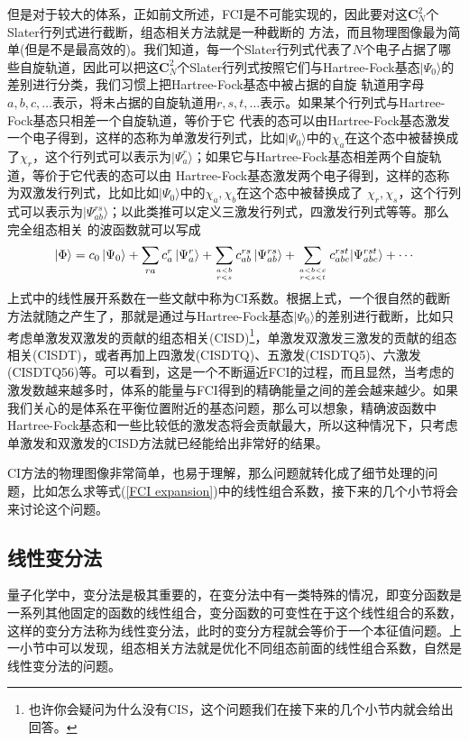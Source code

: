 \documentclass[12pt,a4paper,openany,twoside]{book}
\numberwithin{equation}{section}
\begin{document}
          但是对于较大的体系，正如前文所述，FCI是不可能实现的，因此要对这$\mathbf{C}_N^2$个Slater行列式进行截断，组态相关方法就是一种截断的 方法，而且物理图像最为简单(但是不是最高效的)。我们知道，每一个Slater行列式代表了$N$个电子占据了哪些自旋轨道，因此可以把这$\mathbf  {C}_N^2$个Slater行列式按照它们与Hartree-Fock基态$ | \Psi_0 \rangle $的差别进行分类，我们习惯上把Hartree-Fock基态中被占据的自旋  轨道用字母$a,b,c,\dots$表示，将未占据的自旋轨道用$r,s,t,\dots$表示。如果某个行列式与Hartree-Fock基态只相差一个自旋轨道，等价于它  代表的态可以由Hartree-Fock基态激发一个电子得到，这样的态称为单激发行列式，比如$ | \Psi_0 \rangle $中的$\chi_a$在这个态中被替换成  了$\chi_r$，这个行列式可以表示为$| \Psi_a^r\rangle$；如果它与Hartree-Fock基态相差两个自旋轨道，等价于它代表的态可以由 Hartree-Fock基态激发两个电子得到，这样的态称为双激发行列式，比如比如$ | \Psi_0 \rangle $中的$\chi_a,\chi_b$在这个态中被替换成了  $\chi_r,\chi_s$，这个行列式可以表示为$| \Psi_{ab}^{rs}\rangle$；以此类推可以定义三激发行列式，四激发行列式等等。那么完全组态相关  的波函数就可以写成
          \begin{equation}
            |\Phi\rangle= c_{0}\left|\Psi_{0}\right\rangle+\sum_{r a} c_{a}^{r}\left|\Psi_{a}^{r}\right\rangle+\sum_{a<b \atop r<s} c_{a b}^{r s}\left|\Psi_{a b}^{r s}\right\rangle+\sum_{a<b<c \atop r<s<t} c_{a b c}^{r s t}|\Psi_{a b c}^{r s t}\rangle+\cdots
            \label{FCI expansion}
          \end{equation}
          上式中的线性展开系数在一些文献中称为CI系数。根据上式，一个很自然的截断方法就随之产生了，那就是通过与Hartree-Fock基态$ | \Psi_0 \rangle $的差别进行截断，比如只考虑单激发双激发的贡献的组态相关(CISD)\footnote{也许你会疑问为什么没有CIS，这个问题我们在接下来的几个小节内就会给出回答。}，单激发双激发三激发的贡献的组态相关(CISDT)，或者再加上四激发(CISDTQ)、五激发(CISDTQ5)、六激发(CISDTQ56)等。可以看到，这是一个不断逼近FCI的过程，而且显然，当考虑的激发数越来越多时，体系的能量与FCI得到的精确能量之间的差会越来越少。如果我们关心的是体系在平衡位置附近的基态问题，那么可以想象，精确波函数中Hartree-Fock基态和一些比较低的激发态将会贡献最大，所以这种情况下，只考虑单激发和双激发的CISD方法就已经能给出非常好的结果。

          CI方法的物理图像非常简单，也易于理解，那么问题就转化成了细节处理的问题，比如怎么求等式(\ref{FCI expansion})中的线性组合系数，接下来的几个小节将会来讨论这个问题。
        \subsection{线性变分法}
          量子化学中，变分法是极其重要的，在变分法中有一类特殊的情况，即变分函数是一系列其他固定的函数的线性组合，变分函数的可变性在于这个线性组合的系数，这样的变分方法称为线性变分法，此时的变分方程就会等价于一个本征值问题。上一小节中可以发现，组态相关方法就是优化不同组态前面的线性组合系数，自然是线性变分法的问题。
\end{document}
